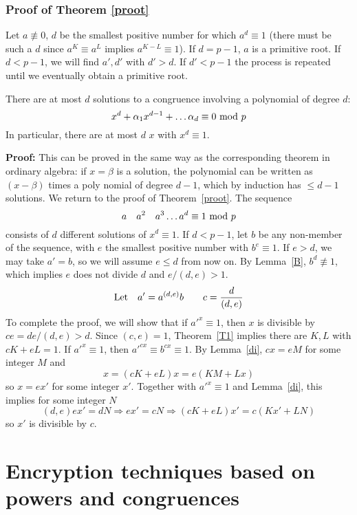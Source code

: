 \subsubsection*{Proof of Theorem \ref{proot}}
Let $a\not\equiv0$, $d$ be the smallest positive number for which $a^d
\equiv1$ (there must be such a $d$ since $a^K\equiv a^L$ implies $a^{K-L}
\equiv1$).  If $d=p-1$, $a$ is a primitive root.  If $d<p-1$, we will
find $a',d'$ with $d'>d$.  If $d'<p-1$ the process is repeated until
we eventually obtain a primitive root.\begin{Le}There are at most $d$
solutions to a congruence involving a polynomial of degree $d$:
$$x^d+\alpha_1x^{d-1}+\dots\alpha_d\equiv0\hbox{ mod }p$$In particular, there are at
most $d$ $x$ with $x^d\equiv1$.\label{B}
\end{Le}{\bf Proof:} This can be proved in
the same way as the corresponding theorem in ordinary algebra: if $x=\beta$
is a solution, the polynomial can be written as $(x-\beta)$ times a poly%
nomial of degree $d-1$, which by induction has $\le d-1$ solutions.
\pq We return to the proof of Theorem~\ref{proot}. The sequence 
$$a\quad a^2\quad a^3\dots a^d\equiv1\hbox{ mod }p$$consists of $d$ different solutions
of $x^d\equiv1$.  If $d<p-1$, let $b$ be any non-member of the sequence,
with $e$ the smallest positive number with $b^e\equiv1$. 
If $e>d$, we may take $a'=b$, so we will assume $e\le d$ from now on.  
By Lemma~\ref{B}, $b^d\not\equiv1$, which implies $e$ does not divide
$d$ and $e/(d,e)>1$. 
$$\hbox{Let\quad}a'=a^{(d,e)}b\qquad c=\frac 
d{(d,e)}$$To complete the proof, we will show that if $a'^x\equiv1$,
then $x$ is divisible by $ce=de/(d,e)>d$.\pq
Since $(c,e)=1$, Theorem~\ref{T1} implies there are $K,L$
with $cK+eL=1$. If $a'^x\equiv1$, then $a'^{cx}\equiv b^{cx}\equiv1$.
By Lemma~\ref{di}, $cx=eM$ for some integer $M$ and
$$x=(cK+eL)x=e(KM+Lx)$$so $x=ex'$ for some integer $x'$.  Together with
$a'^x\equiv1$ and Lemma~\ref{di}, this implies for some integer $N$
$$(d,e)ex'=dN\Rightarrow ex'=cN\Rightarrow (cK+eL)x'=c(Kx'+LN)$$so
$x'$ is divisible by $c$.
\section{Encryption techniques based on powers and congruences}
